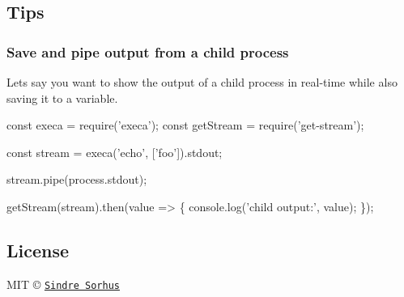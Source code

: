 \subsection*{Tips}

\subsubsection*{Save and pipe output from a child process}

Let\textquotesingle{}s say you want to show the output of a child process in real-\/time while also saving it to a variable.


\begin{DoxyCode}
const execa = require('execa');
const getStream = require('get-stream');

const stream = execa('echo', ['foo']).stdout;

stream.pipe(process.stdout);

getStream(stream).then(value => \{
  console.log('child output:', value);
\});
\end{DoxyCode}


\subsection*{License}

M\+IT © \href{https://sindresorhus.com}{\tt Sindre Sorhus} 